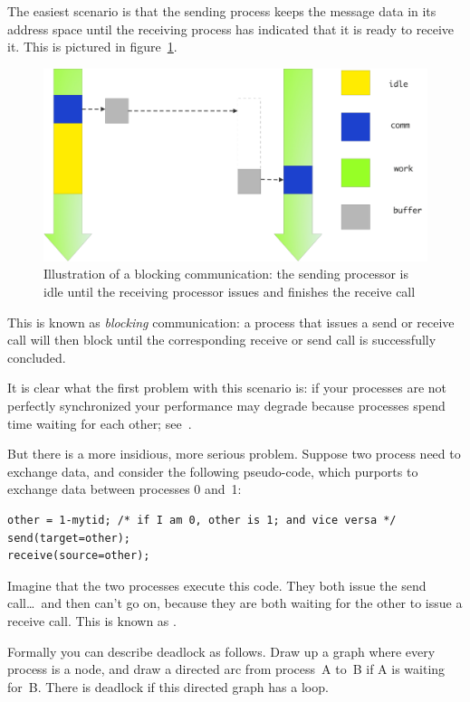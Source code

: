The easiest scenario is that the sending process keeps the message
data in its address space until the receiving process has indicated
that it is ready to receive it. This is pictured in
figure~\ref{fig:send-blocking}.
\begin{figure}[ht]
\includegraphics[scale=.1]{graphics/send-blocking}
\caption{Illustration of a blocking communication: the sending processor is idle until the receiving processor issues and finishes the receive call}
\label{fig:send-blocking}
\end{figure}
This is known as \emph{blocking} communication: a process that issues
a send or receive call will then block until the corresponding receive
or send call is successfully concluded.

It is clear what the first problem with this scenario is: if your
processes are not perfectly synchronized your performance may degrade
because processes spend time waiting for each other;
see~. 

But there is a more insidious, more serious problem.
Suppose two process need to exchange data, and consider the following
pseudo-code, which purports to exchange data between processes 0 and~1:
\begin{verbatim}
other = 1-mytid; /* if I am 0, other is 1; and vice versa */
send(target=other);
receive(source=other);
\end{verbatim}
Imagine that the two processes execute this code. They both issue the
send call\ldots\ and then can't go on, because they are both waiting
for the other to issue a receive call. This is known
as .

Formally you can describe deadlock as follows. Draw up a graph where
every process is a node, and draw a directed arc from process~A to~B if
A is waiting for~B. There is deadlock if this directed graph has a
loop.

